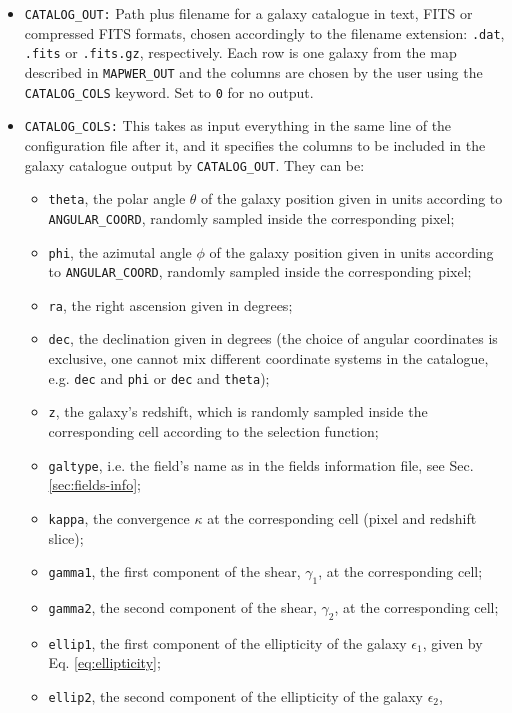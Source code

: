 \documentclass[12pt]{book} %
\begin{document}
\begin{itemize}
\item {\tt CATALOG\_OUT:} Path plus filename for a galaxy catalogue in text, FITS or compressed
  FITS formats, chosen accordingly to the filename extension: {\tt .dat}, {\tt .fits} or {\tt .fits.gz}, 
  respectively. Each row is one galaxy from the map described in {\tt MAPWER\_OUT} and 
  the columns are chosen by the user using the {\tt CATALOG\_COLS} keyword. Set to {\tt 0} for no output.

\item {\tt CATALOG\_COLS:} This takes as input everything in the same line of the configuration 
  file after it, and it specifies the columns to be included in the galaxy catalogue output by 
  {\tt CATALOG\_OUT}. They can be: 
  \begin{itemize}
  \item {\tt theta}, the polar angle $\theta$ of the galaxy position given in units according to 
    {\tt ANGULAR\_COORD}, randomly sampled inside the corresponding pixel; 
  \item {\tt phi}, the azimutal angle $\phi$ of the galaxy position given in units according to 
    {\tt ANGULAR\_COORD}, randomly sampled inside the corresponding pixel;
  \item {\tt ra}, the right ascension given in degrees;
  \item {\tt dec}, the declination given in degrees (the choice of angular coordinates is exclusive, 
    one cannot mix different coordinate systems in the catalogue, e.g. {\tt dec} and {\tt phi} or 
    {\tt dec} and {\tt theta});
  \item {\tt z}, the galaxy's redshift, which is randomly sampled inside the corresponding cell 
    according to the selection function; 
  \item {\tt galtype}, i.e. the field's name as in the fields information file, see Sec. \ref{sec:fields-info}; 
  \item {\tt kappa}, the convergence $\kappa$ at the corresponding cell (pixel and redshift slice);
  \item {\tt gamma1}, the first component of the shear, $\gamma_1$, at the corresponding cell;
  \item {\tt gamma2}, the second component of the shear, $\gamma_2$, at the corresponding cell; 
  \item {\tt ellip1}, the first component of the ellipticity of the galaxy $\epsilon_1$, 
    given by Eq. \ref{eq:ellipticity}; 
  \item {\tt ellip2}, the second component of the ellipticity of the galaxy $\epsilon_2$, 

\end{itemize}
\end{itemize}
\end{document}
